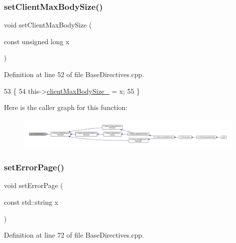 \subsubsection{\texorpdfstring{set\+Client\+Max\+Body\+Size()}{setClientMaxBodySize()}}
{\footnotesize\ttfamily void set\+Client\+Max\+Body\+Size (\begin{DoxyParamCaption}\item[{const unsigned long}]{x }\end{DoxyParamCaption})\hspace{0.3cm}{\ttfamily [inherited]}}



Definition at line 52 of file Base\+Directives.\+cpp.


\begin{DoxyCode}
53     \{
54         this->\hyperlink{classft_1_1_base_directives_ad65c2594d2a90ca065d410dfd4066a19}{clientMaxBodySize\_} = x;
55     \}
\end{DoxyCode}
Here is the caller graph for this function\+:
\nopagebreak
\begin{figure}[H]
\begin{center}
\leavevmode
\includegraphics[width=350pt]{classft_1_1_base_directives_a39bf4922f3236043c76beaffaa557a3b_icgraph}
\end{center}
\end{figure}
\mbox{\label{classft_1_1_base_directives_a505ecc88b3e1779583ad60cc243c7769}} 
\subsubsection{\texorpdfstring{set\+Error\+Page()}{setErrorPage()}}
{\footnotesize\ttfamily void set\+Error\+Page (\begin{DoxyParamCaption}\item[{const std\+::string}]{x }\end{DoxyParamCaption})\hspace{0.3cm}{\ttfamily [inherited]}}



Definition at line 72 of file Base\+Directives.\+cpp.


